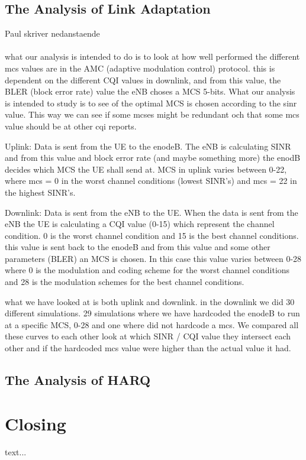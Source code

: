 \documentclass[cropmarks, frame, english]{idamasterthesis}
\begin{document}
\section{The Analysis of Link Adaptation}
Paul skriver nedanstaende \\ \\
what our analysis is intended to do is to look at how well performed the different mcs values are in the AMC (adaptive modulation control) protocol. this is dependent on the different CQI values in downlink, and from this value, the BLER (block error rate) value the eNB choses a MCS 5-bits. What our analysis is intended to study is to see of the optimal MCS is chosen according to the sinr value. This way we can see if some mcses might be redundant och that some mcs value should be at other cqi reports. 

Uplink: \newline
Data is sent from the UE to the enodeB. The eNB is calculating SINR and from this value and block error rate (and maybe something more) the enodB decides which MCS the UE shall send at. MCS in uplink varies between 0-22, where mcs = 0 in the worst channel conditions (lowest SINR's) and mcs = 22 in the highest SINR's. 

Downlink: \newline
Data is sent from the eNB to the UE. When the data is sent from the eNB the UE is calculating a CQI value (0-15) which represent the channel condition. 0 is the worst channel condition and 15 is the best channel conditions. this value is sent back to the enodeB and from this value and some other parameters (BLER) an MCS is chosen. In this case this value varies between 0-28 where 0 is the modulation and coding scheme for the worst channel conditions and 28 is the modulation schemes for the best channel conditions.

what we have looked at is both uplink and downlink. in the downlink we did 30 different simulations. 29 simulations where we have hardcoded the enodeB to run at a specific MCS, 0-28 and one where did not hardcode a mcs. We compared all these curves to each other look at which SINR / CQI value they intersect each other and if the hardcoded mcs value were higher than the actual value it had.

\section{The Analysis of HARQ}

\chapter{Closing}

text...
\end{document}
